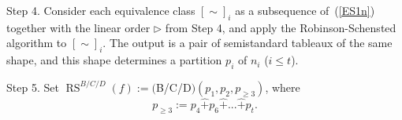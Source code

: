 \documentclass{emsprocart}
\begin{document}



Step 4. Consider each equivalence class $[\sim]_i$ as a subsequence of~(\ref{ES1n}) together with the linear order $\triangleright$ from Step 4, and apply the Robinson-Schensted algorithm to $[\sim]_i$. The output is a pair of semistandard tableaux of the same shape, and this shape determines a partition $p_i$ of $n_i$ ($i\le t$).

Step 5. Set $\operatorname{RS}^{B/C/D}(f):=($B/C/D$)(p_1, p_2, p_{\ge3})$, where $$p_{\ge3}:=p_4\widehat+p_6\widehat+...\widehat+p_t.$$
\end{document}
